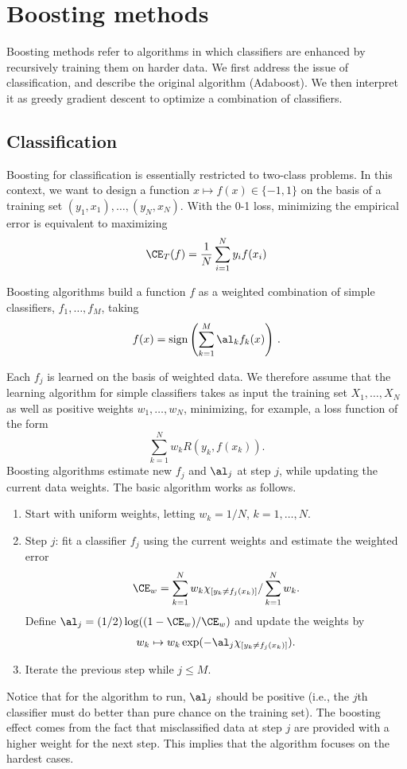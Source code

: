 \chapter{Boosting methods}

Boosting methods refer to algorithms in which classifiers are enhanced by
recursively training them on harder data. We first address the issue
of classification, and describe the original  algorithm (Adaboost). We then
interpret it as greedy gradient descent to optimize a combination of
classifiers.

\section{Classification}
Boosting for classification is essentially restricted to two-class
problems. In this context, we want to design a function $x \mapsto f(x) \in \{-1, 1\}$ on the
basis of a training set $(y_1, x_1), \ldots, (y_N, x_N)$. With the 0-1
loss, minimizing the  empirical error is equivalent to maximizing
$$
\CE_T(f) = \frac{1}{N} \sum_{i=1}^N y_i f(x_i)
$$

Boosting algorithms build a function $f$ as a weighted combination of
simple classifiers, $f_1, \ldots, f_M$, taking
$$
f(x) = \text{sign}\left(\sum_{k=1}^M \al_k f_k(x)\right)\,.
$$

Each $f_j$ is learned on the basis of weighted
data. We therefore assume that the  learning algorithm for simple classifiers takes as input the training set $X_1,\ldots,X_N$ as well as positive weights $w_1, \ldots, w_N$,   minimizing, for example, a loss function of the form
$$
\sum_{k=1}^N w_k R(y_k, f(x_k)).
$$
Boosting algorithms  estimate new $f_j$ and $\al_j$ at step $j$, while updating the current data weights. The basic algorithm works as follows.
\begin{enumerate}[label=(\arabic*),wide]
\item Start with uniform weights, letting  $w_k = 1/N$, $k=1, \ldots, N$.
\item Step $j$: fit a classifier $f_j$ using the current weights and
estimate the weighted error
$$\CE_{w} = \sum_{k=1}^N w_k \chi_{[y_k\neq f_j(x_k)]}/\sum_{k=1}^N
w_k.$$
Define $\al_j = (1/2)\log((1-\CE_w)/\CE_w)$ and update the weights by
$$ w_k \mapsto w_k \exp(-\al_j \chi_{[y_k\neq f_j(x_k)]}).$$
\item Iterate the previous step while $j\leq M$.
\end{enumerate}

Notice that for the algorithm to run, $\al_j$ should be positive (i.e., the $j$th classifier must do
better than pure chance on the training set).
The boosting effect comes from the fact that misclassified data at step $j$
are provided with a higher weight for the next step. This implies that
the algorithm focuses on the hardest cases. 


